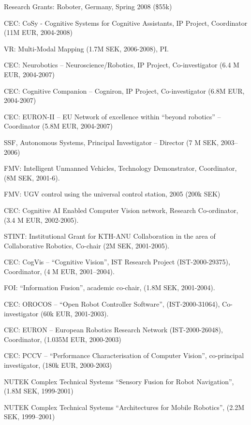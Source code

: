 \documentclass{article}
\begin{document}
\begin{cv}
\begin{cvlist}{Research Grants:}
  Roboter, Germany, Spring 2008 (\$55k)%
\item CEC: CoSy - Cognitive Systems for Cognitive Assistants, IP
  Project, Coordinator (11M EUR, 2004-2008)
\item VR: Multi-Modal Mapping (1.7M SEK, 2006-2008), PI.%
\item CEC: Neurobotics -- Neuroscience/Robotics, IP Project,
  Co-investigator (6.4 M EUR, 2004-2007)%
\item CEC: Cognitive Companion -- Cogniron, IP Project,
  Co-investigator (6.8M EUR, 2004-2007) %
\item CEC: EURON-II -- EU Network of excellence within ``beyond
  robotics''  -- Coordinator (5.8M EUR, 2004-2007) %
\item SSF, Autonomous Systems, Principal Investigator -- Director  (7
  M SEK, 2003--2006) %
\item FMV: Intelligent Unmanned Vehicles, Technology Demonstrator,
  Coordinator, (8M SEK, 2001-6). %
\item FMV: UGV control using the universal control station, 2005 (200k
  SEK) %
\item CEC: Cognitive AI Enabled Computer Vision network, Research
  Co-ordinator, (3.4 M EUR, 2002-2005). %
\item STINT: Institutional Grant for KTH-ANU Collaboration in the area
  of Collaborative Robotics, Co-chair (2M SEK, 2001-2005).%
\item CEC: CogVis -- ``Cognitive Vision'', IST Research Project
  (IST-2000-29375), Coordinator, (4 M EUR, 2001--2004).%
\item FOI: ``Information Fusion'', academic co-chair,  (1.8M SEK, 2001-2004).%
\item CEC: OROCOS -- ``Open Robot Controller Software'',
  (IST-2000-31064), Co-investigator (60k EUR, 2001-2003).%
\item CEC: EURON -- European Robotics Research Network
  (IST-2000-26048), Coordinator, (1.035M EUR, 2000-2003)%
\item CEC: PCCV -- ``Performance Characterisation of Computer
  Vision'',  co-principal investigator, (180k EUR, 2000-2003)%
\item NUTEK Complex Technical Systems ``Sensory Fusion for Robot
  Navigation'', (1.8M SEK, 1999-2001)%
\item NUTEK Complex Technical Systems ``Architectures for Mobile
  Robotics'', (2.2M SEK, 1999--2001)%

\end{cvlist}
\end{cv}
\end{document}
